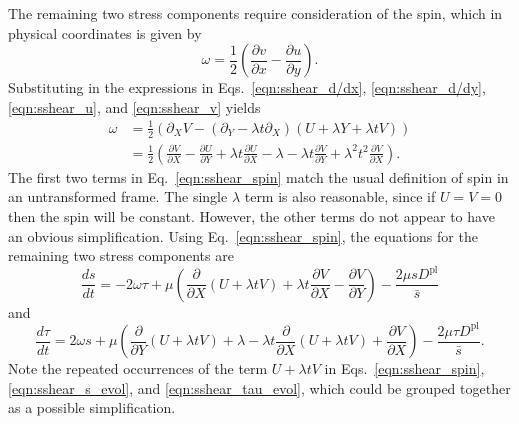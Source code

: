 \documentclass[11pt]{article}
\newcommand{\p}{\partial}
\newcommand{\Dpl}{D^\text{pl}}
\begin{document}
The remaining two stress components require consideration of the spin, which in physical coordinates is given by
\begin{equation}
    \omega = \frac{1}{2}\left(\frac{\p v}{\p x} - \frac{\p u}{\p y}\right).
\end{equation}
Substituting in the expressions in Eqs.~\ref{eqn:sshear_d/dx},
\ref{eqn:sshear_d/dy}, \ref{eqn:sshear_u}, and \ref{eqn:sshear_v} yields
\begin{align}
    \omega &= \frac{1}{2} \left( \p_X V - (\p_Y - \lambda t \p_X) (U+\lambda Y+\lambda t V) \right) \nonumber \\
    &= \frac{1}{2} \left( \frac{\p V}{\p X} - \frac{\p U}{\p Y} + \lambda t \frac{\p U}{\p X}
    -\lambda - \lambda t \frac{\p V}{\p Y} + \lambda^2 t^2 \frac{\p V}{\p X}\right). \label{eqn:sshear_spin}
\end{align}
The first two terms in Eq.~\ref{eqn:sshear_spin} match the usual definition of
spin in an untransformed frame. The single $\lambda$ term is also reasonable,
since if $U=V=0$ then the spin will be constant. However, the other terms do
not appear to have an obvious simplification. Using Eq.~\ref{eqn:sshear_spin},
the equations for the remaining two stress components are
\begin{equation}
    \frac{ds}{dt} = -2\omega \tau + \mu\left(\frac{\p}{\p X}(U + \lambda t V) + \lambda t \frac{\p V}{\p X} - \frac{\p V}{\p Y}\right) - \frac{2\mu s \Dpl}{\bar{s}}
    \label{eqn:sshear_s_evol}
\end{equation}
and
\begin{equation}
    \frac{d\tau}{dt} = 2\omega s +\mu\left(\frac{\p}{\p Y}(U + \lambda t V) + \lambda  - \lambda t \frac{\p}{\p X}(U + \lambda t V) + \frac{\p V}{\p X}\right) - \frac{2\mu\tau\Dpl}{\bar{s}}.
    \label{eqn:sshear_tau_evol}
\end{equation}
Note the repeated occurrences of the term $U+\lambda t V$ in Eqs.~\ref{eqn:sshear_spin}, \ref{eqn:sshear_s_evol}, and \ref{eqn:sshear_tau_evol}, which could be grouped together as a possible simplification.
\end{document}
